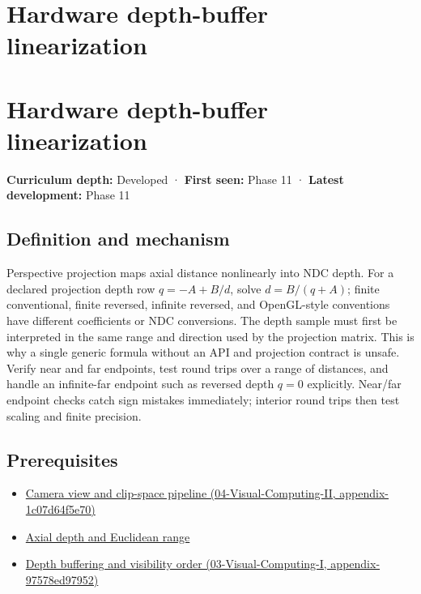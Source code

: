\hypertarget{appendix-1bc40b08db4a}{}
\section*{Hardware depth-buffer linearization}
\section{Hardware depth-buffer linearization}\label{appendix-1bc40b08db4a-hardware-depth-buffer-linearization}

\textbf{Curriculum depth:} Developed · \textbf{First seen:} Phase 11 · \textbf{Latest development:} Phase 11

\subsection{Definition and mechanism}\label{appendix-1bc40b08db4a-definition-and-mechanism}

Perspective projection maps axial distance nonlinearly into NDC depth. For a declared projection depth row \(q=-A+B/d\), solve \(d=B/(q+A)\); finite conventional, finite reversed, infinite reversed, and OpenGL-style conventions have different coefficients or NDC conversions. The depth sample must first be interpreted in the same range and direction used by the projection matrix. This is why a single generic formula without an API and projection contract is unsafe. Verify near and far endpoints, test round trips over a range of distances, and handle an infinite-far endpoint such as reversed depth \(q=0\) explicitly. Near/far endpoint checks catch sign mistakes immediately; interior round trips then test scaling and finite precision.

\subsection{Prerequisites}\label{appendix-1bc40b08db4a-prerequisites}

\begin{itemize}
\tightlist
\item
  \href{../04-Visual-Computing-II/main.pdf\#nameddest=appendix-1c07d64f5e70}{Camera view and clip-space pipeline (04-Visual-Computing-II, appendix-1c07d64f5e70)}
\item
  \hyperref[appendix-cac01ebeeb11]{Axial depth and Euclidean range}
\item
  \href{../03-Visual-Computing-I/main.pdf\#nameddest=appendix-97578ed97952}{Depth buffering and visibility order (03-Visual-Computing-I, appendix-97578ed97952)}
\end{itemize}

